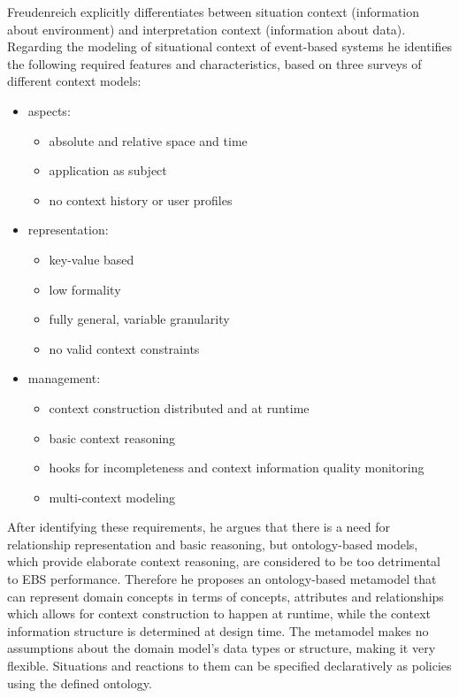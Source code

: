 Freudenreich explicitly differentiates between situation context (information about environment) and interpretation context (information about data). Regarding the modeling of situational context of event-based systems he identifies the following required features and characteristics, based on three surveys of different context models: 
\begin{itemize}
\item aspects:
\begin{itemize}
\item absolute and relative space and time 
\item application as subject
\item no context history or user profiles
\end{itemize}
\item representation: 
\begin{itemize}
\item key-value based
\item low formality
\item fully general, variable granularity
\item no valid context constraints
\end{itemize}
\item management: 
\begin{itemize}
\item context construction distributed and at runtime
\item basic context reasoning
\item hooks for incompleteness and context information quality monitoring
\item multi-context modeling
\end{itemize}
\end{itemize}
After identifying these requirements, he argues that there is a need for relationship representation and basic reasoning, but ontology-based models, which provide elaborate context reasoning, are considered to be too detrimental to EBS performance. Therefore he proposes an ontology-based metamodel that can represent domain concepts in terms of concepts, attributes and relationships which allows for context construction to happen at runtime, while the context information structure is determined at design time. The metamodel makes no assumptions about the domain model's data types or structure, making it very flexible. Situations and reactions to them can be specified declaratively as policies using the defined ontology.

